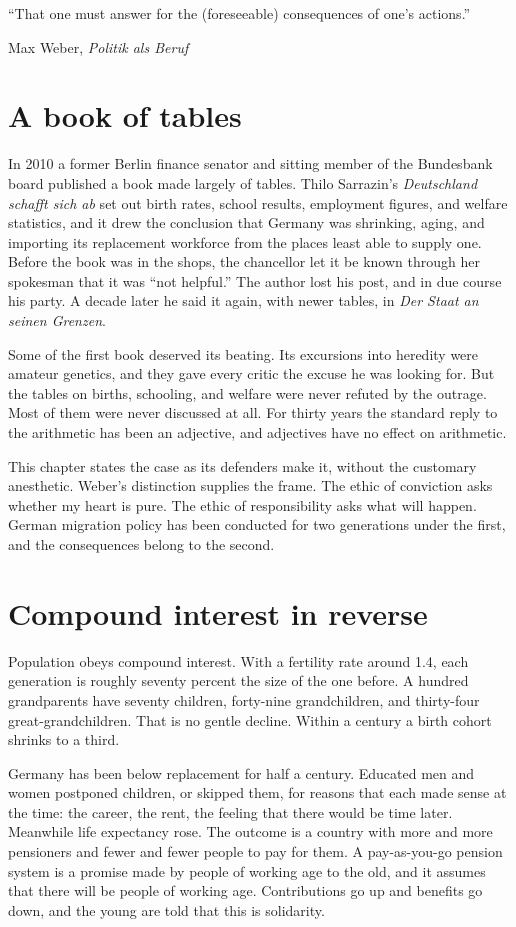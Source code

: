 \documentclass[12pt,a4paper]{book}
\begin{document}
\epigraph{\enquote{That one must answer for the (foreseeable) consequences of one's actions.}}{Max Weber, \emph{Politik als Beruf}}

\section{A book of tables}

In 2010 a former Berlin finance senator and sitting member of the Bundesbank board published a book made largely of tables. Thilo Sarrazin's \emph{Deutschland schafft sich ab} set out birth rates, school results, employment figures, and welfare statistics, and it drew the conclusion that Germany was shrinking, aging, and importing its replacement workforce from the places least able to supply one. Before the book was in the shops, the chancellor let it be known through her spokesman that it was ``not helpful.'' The author lost his post, and in due course his party. A decade later he said it again, with newer tables, in \emph{Der Staat an seinen Grenzen}.

Some of the first book deserved its beating. Its excursions into heredity were amateur genetics, and they gave every critic the excuse he was looking for. But the tables on births, schooling, and welfare were never refuted by the outrage. Most of them were never discussed at all. For thirty years the standard reply to the arithmetic has been an adjective, and adjectives have no effect on arithmetic.

This chapter states the case as its defenders make it, without the customary anesthetic. Weber's distinction supplies the frame. The ethic of conviction asks whether my heart is pure. The ethic of responsibility asks what will happen. German migration policy has been conducted for two generations under the first, and the consequences belong to the second.

\section{Compound interest in reverse}

Population obeys compound interest. With a fertility rate around 1.4, each generation is roughly seventy percent the size of the one before. A hundred grandparents have seventy children, forty-nine grandchildren, and thirty-four great-grandchildren. That is no gentle decline. Within a century a birth cohort shrinks to a third.

Germany has been below replacement for half a century. Educated men and women postponed children, or skipped them, for reasons that each made sense at the time: the career, the rent, the feeling that there would be time later. Meanwhile life expectancy rose. The outcome is a country with more and more pensioners and fewer and fewer people to pay for them. A pay-as-you-go pension system is a promise made by people of working age to the old, and it assumes that there will be people of working age. Contributions go up and benefits go down, and the young are told that this is solidarity.
\end{document}
